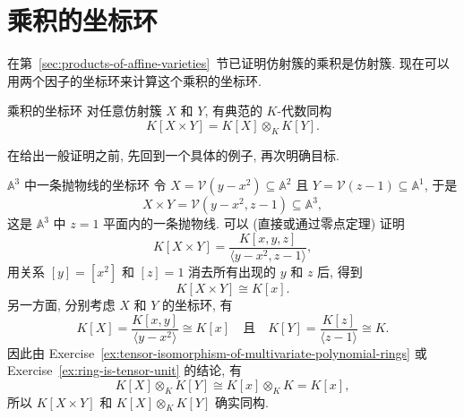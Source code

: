 \section{乘积的坐标环}\label{sec:coordinate-rings-of-products}

在第~\ref{sec:products-of-affine-varieties}~节已证明仿射簇的乘积是仿射簇. 现在可以用两个因子的坐标环来计算这个乘积的坐标环.

\begin{Theorem}{乘积的坐标环}\leavevmode\label{thm:coordinate-ring-of-product-is-tensor-product}
对任意仿射簇 $X$ 和 $Y$, 有典范的 $K$-代数同构
\[
  K[X\times Y]=K[X]\otimes_{K}K[Y].
\]
\end{Theorem}

在给出一般证明之前, 先回到一个具体的例子, 再次明确目标.

\begin{Example}{$\mathbb{A}^{3}$ 中一条抛物线的坐标环}\leavevmode\label{ex:coordinate-ring-of-parabola-in-three-space}
令 $X=\mathcal{V}(y-x^{2})\subseteq\mathbb{A}^{2}$ 且 $Y=\mathcal{V}(z-1)\subseteq\mathbb{A}^{1}$, 于是
\[
  X\times Y=\mathcal{V}(y-x^{2},z-1)\subseteq\mathbb{A}^{3},
\]
这是 $\mathbb{A}^{3}$ 中 $z=1$ 平面内的一条抛物线. 可以 (直接或通过零点定理) 证明
\[
  K[X\times Y]=\frac{K[x,y,z]}{\langle y-x^{2},z-1\rangle},
\]
用关系 $[y]=[x^{2}]$ 和 $[z]=1$ 消去所有出现的 $y$ 和 $z$ 后, 得到
\[
  K[X\times Y]\cong K[x].
\]
另一方面, 分别考虑 $X$ 和 $Y$ 的坐标环, 有
\[
  K[X]=\frac{K[x,y]}{\langle y-x^{2}\rangle}\cong K[x]
  \quad\text{且}\quad
  K[Y]=\frac{K[z]}{\langle z-1\rangle}\cong K.
\]
因此由 Exercise~\ref{ex:tensor-isomorphism-of-multivariate-polynomial-rings} 或 Exercise~\ref{ex:ring-is-tensor-unit} 的结论, 有
\[
  K[X]\otimes_{K}K[Y]\cong K[x]\otimes_{K}K=K[x],
\]
所以 $K[X\times Y]$ 和 $K[X]\otimes_{K}K[Y]$ 确实同构.
\end{Example}

